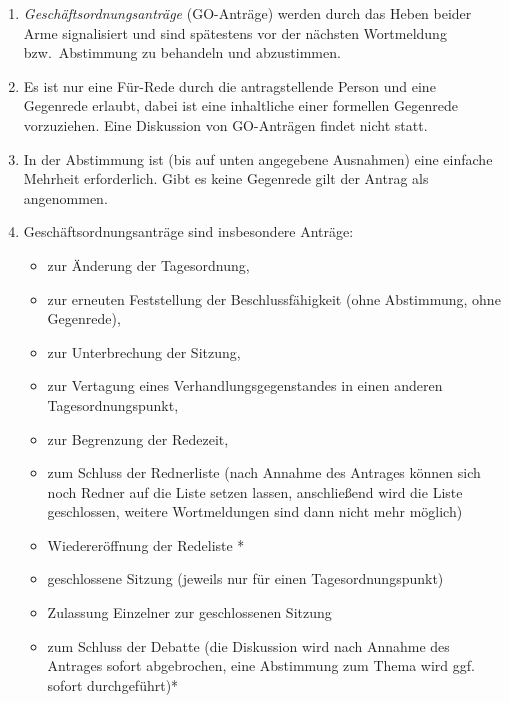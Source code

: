 \documentclass[draft,12pt,oneside]{scrreprt}
\begin{document}
\begin{enumerate}
\item \textit{Geschäftsordnungsanträge} (GO-Anträge) werden durch das Heben
      beider Arme signalisiert und sind spätestens vor der nächsten Wortmeldung
      bzw.\ Abstimmung zu behandeln und abzustimmen.

\item Es ist nur eine Für-Rede durch die antragstellende Person und eine Gegenrede
      erlaubt, dabei ist eine inhaltliche einer formellen Gegenrede vorzuziehen.
      Eine Diskussion von GO-Anträgen findet nicht statt.

\item In der Abstimmung ist (bis auf unten angegebene Ausnahmen) eine einfache
      Mehrheit erforderlich.
      Gibt es keine Gegenrede gilt der Antrag als angenommen.

\item Geschäftsordnungsanträge sind insbesondere Anträge:
      \begin{itemize}
      \item zur Änderung der Tagesordnung,

      \item zur erneuten Feststellung der Beschlussfähigkeit
            (ohne Abstimmung, ohne Gegenrede),

      \item zur Unterbrechung der Sitzung,

      \item zur Vertagung eines Verhandlungsgegenstandes in einen anderen
            Tagesordnungspunkt,

      \item zur Begrenzung der Redezeit,

      \item zum Schluss der Rednerliste (nach Annahme des Antrages können sich
            noch Redner auf die Liste setzen lassen, anschließend wird die Liste
            geschlossen, weitere Wortmeldungen sind dann nicht mehr möglich)

      \item Wiedereröffnung der Redeliste *

      \item geschlossene Sitzung (jeweils nur für einen Tagesordnungspunkt)

      \item Zulassung Einzelner zur geschlossenen Sitzung

      \item zum Schluss der Debatte (die Diskussion wird nach Annahme des
            Antrages sofort abgebrochen, eine Abstimmung zum Thema wird ggf.
            sofort durchgeführt)*


\end{itemize}
\end{enumerate}
\end{document}
